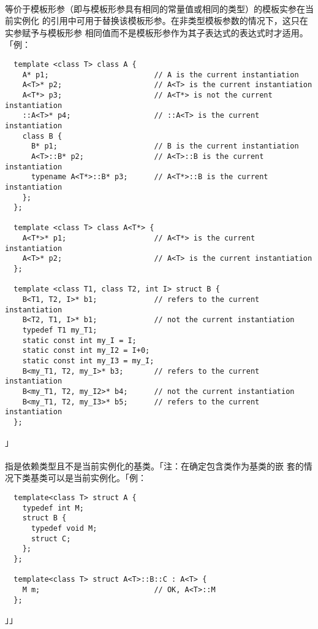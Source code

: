 \paragraph{}
等价于模板形参（即与模板形参具有相同的常量值或相同的类型）的模板实参在当前实例化
的引用中可用于替换该模板形参。在非类型模板参数的情况下，这只在实参赋予与模板形参
相同值而不是模板形参作为其子表达式的表达式时才适用。「例：
\begin{lstlisting}
  template <class T> class A {
    A* p1;                        // A is the current instantiation
    A<T>* p2;                     // A<T> is the current instantiation
    A<T*> p3;                     // A<T*> is not the current instantiation
    ::A<T>* p4;                   // ::A<T> is the current instantiation
    class B {
      B* p1;                      // B is the current instantiation
      A<T>::B* p2;                // A<T>::B is the current instantiation
      typename A<T*>::B* p3;      // A<T*>::B is the current instantiation
    };
  };

  template <class T> class A<T*> {
    A<T*>* p1;                    // A<T*> is the current instantiation
    A<T>* p2;                     // A<T> is the current instantiation
  };

  template <class T1, class T2, int I> struct B {
    B<T1, T2, I>* b1;             // refers to the current instantiation
    B<T2, T1, I>* b1;             // not the current instantiation
    typedef T1 my_T1;
    static const int my_I = I;
    static const int my_I2 = I+0;
    static const int my_I3 = my_I;
    B<my_T1, T2, my_I>* b3;       // refers to the current instantiation
    B<my_T1, T2, my_I2>* b4;      // not the current instantiation
    B<my_T1, T2, my_I3>* b5;      // refers to the current instantiation
  };
\end{lstlisting}」

\paragraph{}
指是依赖类型且不是当前实例化的基类。「注：在确定包含类作为基类的嵌
套的情况下类基类可以是当前实例化。「例：
\begin{lstlisting}
  template<class T> struct A {
    typedef int M;
    struct B {
      typedef void M;
      struct C;
    };
  };

  template<class T> struct A<T>::B::C : A<T> {
    M m;                          // OK, A<T>::M
  };
\end{lstlisting}」」

